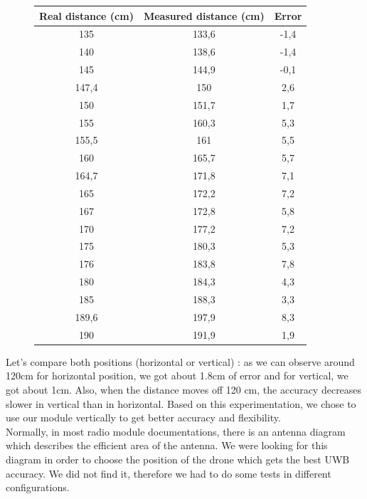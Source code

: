 \begin{figure}[H]
\begin{minipage}[t]{0.46\textwidth}
    \vspace{0pt}
    \centering
    \begin{tabular}{|c|c|c|}
      \hline
      Real distance (cm) & Measured distance (cm) & Error \\ \hline
      135   & 133,6 & -1,4 \\ \hline
      140   & 138,6 & -1,4 \\ \hline
      145   & 144,9 & -0,1 \\ \hline
      147,4 & 150   & 2,6  \\ \hline
      150   & 151,7 & 1,7  \\ \hline
      155   & 160,3 & 5,3  \\ \hline
      155,5 & 161   & 5,5  \\ \hline
      160   & 165,7 & 5,7  \\ \hline
      164,7 & 171,8 & 7,1  \\ \hline
      165   & 172,2 & 7,2  \\ \hline
      167   & 172,8 & 5,8  \\ \hline
      170   & 177,2 & 7,2  \\ \hline
      175   & 180,3 & 5,3  \\ \hline
      176   & 183,8 & 7,8  \\ \hline
      180   & 184,3 & 4,3  \\ \hline
      185   & 188,3 & 3,3  \\ \hline
      189,6 & 197,9 & 8,3  \\ \hline
      190   & 191,9 & 1,9  \\ \hline
    \end{tabular}
  \end{minipage}

\end{figure}

Let's compare both positions (horizontal or vertical) : as we can observe around 120cm for horizontal position, we got about 1.8cm of error and for vertical, we got about 1cm. Also, when the distance moves off 120 cm, the accuracy decreases slower in vertical than in horizontal. Based on this experimentation, we chose to use our module vertically to get better accuracy and flexibility. \\

\noindent Normally, in most radio module documentations, there is an antenna diagram which describes the efficient area of the antenna. We were looking for this diagram in order to choose the position of the drone which gets the best UWB accuracy. We did not find it, therefore we had to do some tests in different configurations.


